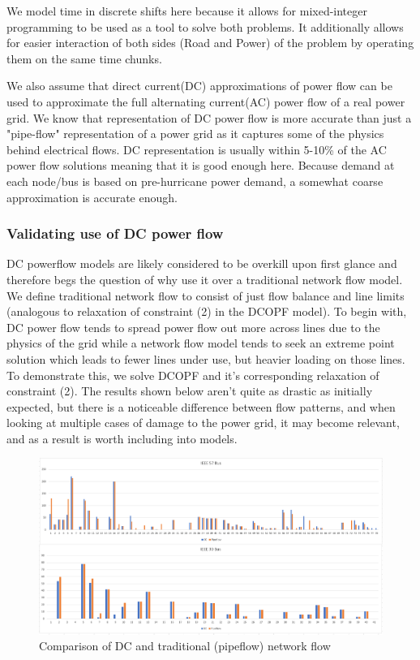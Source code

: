 \documentclass{article}
\begin{document}
	We model time in discrete shifts here because it allows for mixed-integer programming to be used as a tool to solve both problems. It additionally allows for easier interaction of both sides (Road and Power) of the problem by operating them on the same time chunks.
	
	We also assume that direct current(DC) approximations of power flow can be used to approximate the full alternating current(AC) power flow of a real power grid. We know that representation of DC power flow is more accurate than just a "pipe-flow" representation of a power grid as it captures some of the physics behind electrical flows. DC representation is usually within 5-10\% of the AC power flow solutions \cite{Frank2016} \cite{StottEA2009} meaning that it is good enough here. Because demand at each node/bus is based on pre-hurricane power demand, a somewhat coarse approximation is accurate enough.  
	\subsubsection{Validating use of DC power flow}
	DC powerflow models are likely considered to be overkill upon first glance and therefore begs the question of why use it over a traditional network flow model. We define traditional network flow to consist of just flow balance and line limits (analogous to relaxation of constraint (2) in the DCOPF model). To begin with, DC power flow tends to spread power flow out more across lines due to the physics of the grid while a network flow model tends to seek an extreme point solution which leads to fewer lines under use, but heavier loading on those lines. To demonstrate this, we solve DCOPF and it's corresponding relaxation of constraint (2). The results shown below aren't quite as drastic as initially expected, but there is a noticeable difference between flow patterns, and when looking at multiple cases of damage to the power grid, it may become relevant, and as a result is worth including into models.
	
	\begin{figure}
		\centering
		\includegraphics[width=\linewidth]{DCvsPipeflow.PNG}
		\caption{Comparison of DC and traditional (pipeflow) network flow}
	\end{figure}
	
\end{document}
